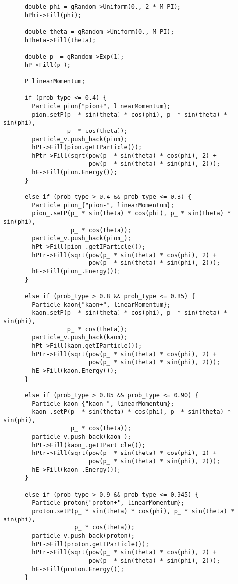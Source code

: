\begin{lstlisting}
      double phi = gRandom->Uniform(0., 2 * M_PI);
      hPhi->Fill(phi);

      double theta = gRandom->Uniform(0., M_PI);
      hTheta->Fill(theta);

      double p_ = gRandom->Exp(1);
      hP->Fill(p_);

      P linearMomentum;

      if (prob_type <= 0.4) {
        Particle pion{"pion+", linearMomentum};
        pion.setP(p_ * sin(theta) * cos(phi), p_ * sin(theta) * sin(phi),
                  p_ * cos(theta));
        particle_v.push_back(pion);
        hPt->Fill(pion.getIParticle());
        hPtr->Fill(sqrt(pow(p_ * sin(theta) * cos(phi), 2) +
                        pow(p_ * sin(theta) * sin(phi), 2)));
        hE->Fill(pion.Energy());
      }

      else if (prob_type > 0.4 && prob_type <= 0.8) {
        Particle pion_{"pion-", linearMomentum};
        pion_.setP(p_ * sin(theta) * cos(phi), p_ * sin(theta) * sin(phi),
                   p_ * cos(theta));
        particle_v.push_back(pion_);
        hPt->Fill(pion_.getIParticle());
        hPtr->Fill(sqrt(pow(p_ * sin(theta) * cos(phi), 2) +
                        pow(p_ * sin(theta) * sin(phi), 2)));
        hE->Fill(pion_.Energy());
      }

      else if (prob_type > 0.8 && prob_type <= 0.85) {
        Particle kaon{"kaon+", linearMomentum};
        kaon.setP(p_ * sin(theta) * cos(phi), p_ * sin(theta) * sin(phi),
                  p_ * cos(theta));
        particle_v.push_back(kaon);
        hPt->Fill(kaon.getIParticle());
        hPtr->Fill(sqrt(pow(p_ * sin(theta) * cos(phi), 2) +
                        pow(p_ * sin(theta) * sin(phi), 2)));
        hE->Fill(kaon.Energy());
      }

      else if (prob_type > 0.85 && prob_type <= 0.90) {
        Particle kaon_{"kaon-", linearMomentum};
        kaon_.setP(p_ * sin(theta) * cos(phi), p_ * sin(theta) * sin(phi),
                   p_ * cos(theta));
        particle_v.push_back(kaon_);
        hPt->Fill(kaon_.getIParticle());
        hPtr->Fill(sqrt(pow(p_ * sin(theta) * cos(phi), 2) +
                        pow(p_ * sin(theta) * sin(phi), 2)));
        hE->Fill(kaon_.Energy());
      }

      else if (prob_type > 0.9 && prob_type <= 0.945) {
        Particle proton{"proton+", linearMomentum};
        proton.setP(p_ * sin(theta) * cos(phi), p_ * sin(theta) * sin(phi),
                    p_ * cos(theta));
        particle_v.push_back(proton);
        hPt->Fill(proton.getIParticle());
        hPtr->Fill(sqrt(pow(p_ * sin(theta) * cos(phi), 2) +
                        pow(p_ * sin(theta) * sin(phi), 2)));
        hE->Fill(proton.Energy());
      }


\end{lstlisting}
